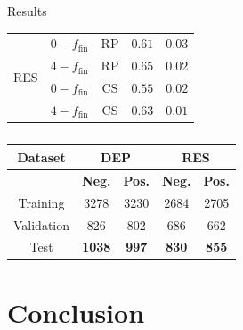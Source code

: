 \documentclass{beamer}
\begin{document}
\begin{frame}{Results}
\begin{table}[t]
{\begin{tabular}{|c|c|c|c|c|}
\multirow{4}{*}{RES} & $0-f_{\text{fin}}$ & RP &   $0.61$ & $0.03$ \\ \cline{2-5}               
                     & $4-f_{\text{fin}}$ & RP &       $\mathbf{0.65}$ & $0.02$    \\ \cline{2-5}   
                     & $0-f_{\text{fin}}$ & CS &      $0.55$ & $0.02$ \\ \cline{2-5}               
                     & $4-f_{\text{fin}}$ & CS &      $0.63$ & $0.01$ \\ \hline               
\end{tabular}
}
\end{table}
\begin{table}[t]
\centering
\ssmall
\begin{tabular}{|c|c|c|c|c|}
\hline
\textbf{Dataset} & \multicolumn{2}{c}{\textbf{DEP}} \vline & \multicolumn{2}{c}{\textbf{RES}} \vline \\ \hline
& \textbf{Neg.} & \textbf{Pos.} & \textbf{Neg.} & \textbf{Pos.} \\ \hline
Training & 3278 & 3230 & 2684 & 2705 \\ \hline 
Validation & 826 & 802 & 686 & 662 \\ \hline 
Test & \textbf{1038} & \textbf{997} & \textbf{830} & \textbf{855} \\ \hline 
\end{tabular}
\caption{}
\end{table}
\end{frame}


\section{Conclusion}

\end{document}
